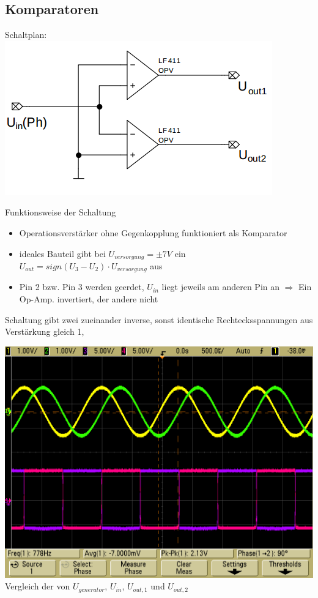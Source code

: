 \documentclass[compress,11pt]{beamer}
\begin{document}
\subsection{Komparatoren}
\begin{frame}
Schaltplan:\\
\includegraphics[width=.7\textwidth]{schalt/komparator}
\end{frame}
\begin{frame}
\begin{block}{Funktionsweise der Schaltung}
\begin{itemize}
\item Operationsverstärker ohne Gegenkopplung funktioniert als Komparator
\item ideales Bauteil gibt bei $U_{versorgung} = \pm 7 V$ ein $U_{out} = sign(U_3 - U_2) \cdot U_{versorgung}$ aus
\item Pin 2 bzw. Pin 3 werden geerdet, $U_{in}$ liegt jeweils am anderen Pin an $\Rightarrow$ Ein Op-Amp. invertiert, der andere nicht
\end{itemize}
\end{block}
Schaltung gibt zwei zueinander inverse, sonst identische Rechtecksspannungen aus\\
Verstärkung gleich 1, 
\end{frame}
\begin{frame}
\includegraphics[width=.7\textwidth]{../oszi/scope_5}\\
Vergleich der von $U_{generator}$, $U_{in}$, $U_{out,1}$ und $U_{out,2}$
\end{frame}
\end{document}

